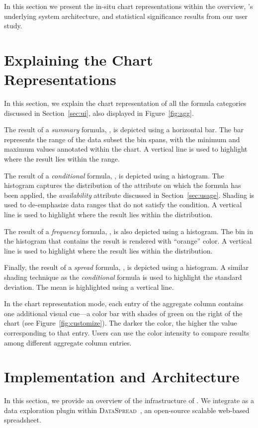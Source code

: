 

In this section we present the in-situ chart representations within
the overview, \noah’s underlying system architecture,
and statistical significance results from our user study.
\section*{Explaining the Chart Representations}

In this section, we explain the chart representation of all the
formula categories discussed in Section~\ref{sec:ui},
also displayed in Figure~\ref{fig:agg}.

 The result of a \emph{summary} formula,
\eg {}, is depicted using a horizontal bar.
The bar represents
the range of the data subset the bin spans,
with the minimum and maximum values
annotated within the chart. A vertical line is used to highlight
where the result lies within the range.
   
 The result of a \emph{conditional} formula,
\eg {}, is depicted using a histogram.
The histogram captures the distribution of the attribute
on which the formula has been applied,
\eg the \emph{availability} attribute discussed
in Section~\ref{sec:usage}.
Shading is used to de-emphasize data ranges
that do not satisfy the condition. A vertical line is used to highlight
where the result lies within the distribution.

 The result of a \emph{frequency} formula,
\eg {}, is also depicted using a histogram.
The bin in the histogram
that contains the result is rendered with ``orange'' color.
A vertical line is used to highlight
where the result lies within the distribution.

 Finally, the result of a \emph{spread} formula,
\eg {}, is depicted using a histogram.
A similar shading technique as the \emph{conditional} formula is used to highlight the standard deviation. The mean is highlighted using a vertical line.

In the chart representation mode,
each entry of the aggregate column
contains one additional visual cue---a color bar
with shades of green on
the right of the chart (see Figure~\ref{fig:customize}).
The darker the color, the higher the value corresponding to that entry. 
Users can use the color intensity
to compare results among different aggregate column entries.

\section*{Implementation and  Architecture}
\label{sec:sys}
In this section, we provide an overview of the infrastructure of \noah. 
We integrate \noah as a data exploration plugin within {\scshape DataSpread}~\cite{dataspread}, 
an open-source scalable web-based spreadsheet.


